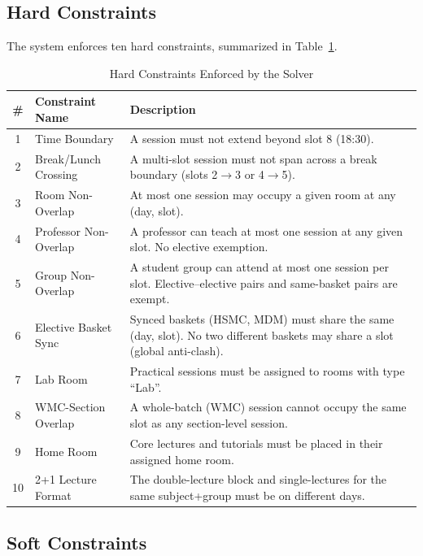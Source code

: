 \subsection{Hard Constraints}

The system enforces ten hard constraints, summarized in Table~\ref{tab:hard_constraints}.

\begin{table}[htbp]
\centering
\caption{Hard Constraints Enforced by the Solver}
\label{tab:hard_constraints}
\renewcommand{\arraystretch}{1.4}
\begin{tabularx}{\textwidth}{@{} c l X @{}}
\toprule
\textbf{\#} & \textbf{Constraint Name} & \textbf{Description} \\
\midrule
1 & Time Boundary & A session must not extend beyond slot 8 (18:30). \\
2 & Break/Lunch Crossing & A multi-slot session must not span across a break boundary (slots 2$\to$3 or 4$\to$5). \\
3 & Room Non-Overlap & At most one session may occupy a given room at any (day, slot). \\
4 & Professor Non-Overlap & A professor can teach at most one session at any given slot. No elective exemption. \\
5 & Group Non-Overlap & A student group can attend at most one session per slot. Elective--elective pairs and same-basket pairs are exempt. \\
6 & Elective Basket Sync & Synced baskets (HSMC, MDM) must share the same (day, slot). No two different baskets may share a slot (global anti-clash). \\
7 & Lab Room & Practical sessions must be assigned to rooms with type ``Lab''. \\
8 & WMC-Section Overlap & A whole-batch (WMC) session cannot occupy the same slot as any section-level session. \\
9 & Home Room & Core lectures and tutorials must be placed in their assigned home room. \\
10 & 2+1 Lecture Format & The double-lecture block and single-lectures for the same subject+group must be on different days. \\
\bottomrule
\end{tabularx}
\end{table}

\subsection{Soft Constraints}

